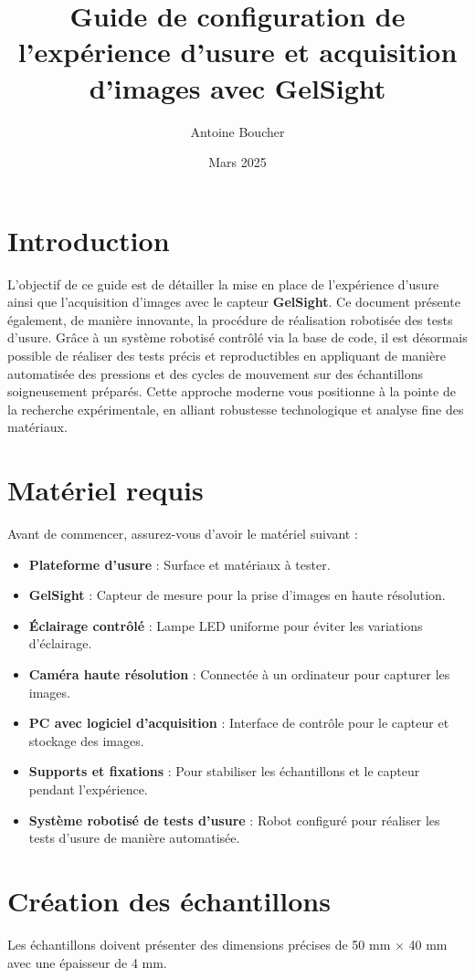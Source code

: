 \documentclass[a4paper,12pt]{article}
\title{Guide de configuration de l'expérience d'usure et acquisition d'images avec GelSight}
\author{Antoine Boucher}
\date{Mars 2025}
\begin{document}
\maketitle

\tableofcontents

\section{Introduction}
L'objectif de ce guide est de détailler la mise en place de l'expérience d'usure ainsi que l'acquisition d'images avec le capteur \textbf{GelSight}. Ce document présente également, de manière innovante, la procédure de réalisation robotisée des tests d'usure. Grâce à un système robotisé contrôlé via la base de code, il est désormais possible de réaliser des tests précis et reproductibles en appliquant de manière automatisée des pressions et des cycles de mouvement sur des échantillons soigneusement préparés. Cette approche moderne vous positionne à la pointe de la recherche expérimentale, en alliant robustesse technologique et analyse fine des matériaux.

\section{Matériel requis}
Avant de commencer, assurez-vous d'avoir le matériel suivant :
\begin{itemize}
    \item \textbf{Plateforme d'usure} : Surface et matériaux à tester.
    \item \textbf{GelSight} : Capteur de mesure pour la prise d'images en haute résolution.
    \item \textbf{Éclairage contrôlé} : Lampe LED uniforme pour éviter les variations d’éclairage.
    \item \textbf{Caméra haute résolution} : Connectée à un ordinateur pour capturer les images.
    \item \textbf{PC avec logiciel d'acquisition} : Interface de contrôle pour le capteur et stockage des images.
    \item \textbf{Supports et fixations} : Pour stabiliser les échantillons et le capteur pendant l’expérience.
    \item \textbf{Système robotisé de tests d'usure} : Robot configuré pour réaliser les tests d'usure de manière automatisée.
\end{itemize}

\section{Création des échantillons}
Les échantillons doivent présenter des dimensions précises de 50 mm $\times$ 40 mm avec une épaisseur de 4 mm.
\end{document}
